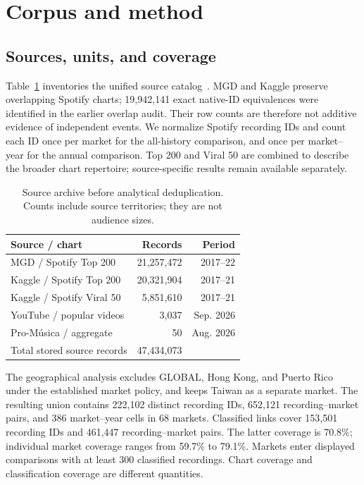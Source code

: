 \documentclass[10pt,a4paper,twocolumn]{article}
\begin{document}
\section{Corpus and method}
\subsection{Sources, units, and coverage}
Table~\ref{tab:sources} inventories the unified source catalog~\cite{archive}. MGD and Kaggle preserve overlapping Spotify charts; 19,942,141 exact native-ID equivalences were identified in the earlier overlap audit. Their row counts are therefore not additive evidence of independent events. We normalize Spotify recording IDs and count each ID once per market for the all-history comparison, and once per market--year for the annual comparison. Top 200 and Viral 50 are combined to describe the broader chart repertoire; source-specific results remain available separately.

\begin{table}[t]
\caption{Source archive before analytical deduplication. Counts include source territories; they are not audience sizes.}
\label{tab:sources}
\centering\footnotesize\setlength{\tabcolsep}{3pt}
\begin{tabularx}{\columnwidth}{@{}Xrr@{}}
\toprule Source / chart & Records & Period \\
\midrule
MGD / Spotify Top 200 & 21,257,472 & 2017--22 \\
Kaggle / Spotify Top 200 & 20,321,904 & 2017--21 \\
Kaggle / Spotify Viral 50 & 5,851,610 & 2017--21 \\
YouTube / popular videos & 3,037 & Sep. 2026 \\
Pro-M\'usica / aggregate & 50 & Aug. 2026 \\
\midrule Total stored source records & 47,434,073 & \\
\bottomrule
\end{tabularx}
\end{table}

The geographical analysis excludes GLOBAL, Hong Kong, and Puerto Rico under the established market policy, and keeps Taiwan as a separate market. The resulting union contains 222,102 distinct recording IDs, 652,121 recording--market pairs, and 386 market--year cells in 68 markets. Classified links cover 153,501 recording IDs and 461,447 recording--market pairs. The latter coverage is 70.8\%; individual market coverage ranges from 59.7\% to 79.1\%. Markets enter displayed comparisons with at least 300 classified recordings. Chart coverage and classification coverage are different quantities.
\end{document}
